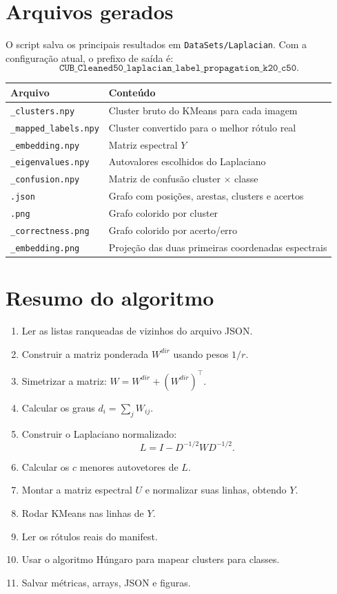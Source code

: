 \documentclass[11pt,a4paper]{article}
\begin{document}
\section{Arquivos gerados}

O script salva os principais resultados em \texttt{DataSets/Laplacian}.
Com a configuração atual, o prefixo de saída é:
\[
\texttt{CUB\_Cleaned50\_laplacian\_label\_propagation\_k20\_c50}.
\]

\begin{center}
\begin{tabular}{ll}
\toprule
Arquivo & Conteúdo\\
\midrule
\texttt{\_clusters.npy} & Cluster bruto do KMeans para cada imagem\\
\texttt{\_mapped\_labels.npy} & Cluster convertido para o melhor rótulo real\\
\texttt{\_embedding.npy} & Matriz espectral \(Y\)\\
\texttt{\_eigenvalues.npy} & Autovalores escolhidos do Laplaciano\\
\texttt{\_confusion.npy} & Matriz de confusão cluster \(\times\) classe\\
\texttt{.json} & Grafo com posições, arestas, clusters e acertos\\
\texttt{.png} & Grafo colorido por cluster\\
\texttt{\_correctness.png} & Grafo colorido por acerto/erro\\
\texttt{\_embedding.png} & Projeção das duas primeiras coordenadas espectrais\\
\bottomrule
\end{tabular}
\end{center}

\section{Resumo do algoritmo}

\begin{enumerate}
    \item Ler as listas ranqueadas de vizinhos do arquivo JSON.
    \item Construir a matriz ponderada \(W^{dir}\) usando pesos \(1/r\).
    \item Simetrizar a matriz: \(W = W^{dir} + (W^{dir})^\top\).
    \item Calcular os graus \(d_i=\sum_j W_{ij}\).
    \item Construir o Laplaciano normalizado:
    \[
    L=I-D^{-1/2}WD^{-1/2}.
    \]
    \item Calcular os \(c\) menores autovetores de \(L\).
    \item Montar a matriz espectral \(U\) e normalizar suas linhas, obtendo \(Y\).
    \item Rodar KMeans nas linhas de \(Y\).
    \item Ler os rótulos reais do manifest.
    \item Usar o algoritmo Húngaro para mapear clusters para classes.
    \item Salvar métricas, arrays, JSON e figuras.
\end{enumerate}
\end{document}
